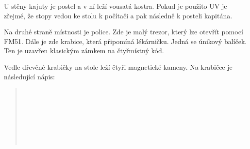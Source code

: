 \documentclass[11pt,oneside,a4paper]{article}
\begin{document}
U stěny kajuty je postel a v ní leží vousatá kostra. Pokud je použito UV je zřejmé, že stopy vedou ke stolu k počítači a pak následně k posteli kapitána.

Na druhé straně místnosti je police. Zde je malý trezor, který lze otevřít pomocí FM51. Dále je zde krabice, která připomíná lékárničku. Jedná se únikový balíček. Ten je uzavřen klasickým zámkem na čtyřmístný kód.

Vedle dřevěné krabičky na stole leží čtyři magnetické kameny. Na krabičce je následující nápis:
\begin{quote}
\\
\\

\\
\\

\\
\\
\end{quote}
\end{document}
